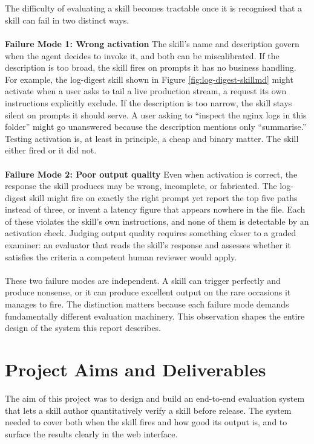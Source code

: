 \\\\
The difficulty of evaluating a skill becomes tractable once it is recognised that a skill can fail in two distinct ways.
\\\\
\textbf{Failure Mode 1: Wrong activation} The skill's name and description govern when the agent decides to invoke it, and both can be miscalibrated. If the description is too broad, the skill fires on prompts it has no business handling. For example, the log-digest skill shown in Figure \ref{fig:log-digest-skillmd} might activate when a user asks to tail a live production stream, a request its own instructions explicitly exclude. If the description is too narrow, the skill stays silent on prompts it should serve. A user asking to ``inspect the nginx logs in this folder'' might go unanswered because the description mentions only ``summarise.'' Testing activation is, at least in principle, a cheap and binary matter. The skill either fired or it did not.
\\\\
\textbf{Failure Mode 2: Poor output quality} Even when activation is correct, the response the skill produces may be wrong, incomplete, or fabricated. The log-digest skill might fire on exactly the right prompt yet report the top five paths instead of three, or invent a latency figure that appears nowhere in the file. Each of these violates the skill's own instructions, and none of them is detectable by an activation check. Judging output quality requires something closer to a graded examiner: an evaluator that reads the skill's response and assesses whether it satisfies the criteria a competent human reviewer would apply.
\\\\
These two failure modes are independent. A skill can trigger perfectly and produce nonsense, or it can produce excellent output on the rare occasions it manages to fire. The distinction matters because each failure mode demands fundamentally different evaluation machinery. This observation shapes the entire design of the system this report describes.

\section{Project Aims and Deliverables}
The aim of this project was to design and build an end-to-end evaluation system that lets a skill author quantitatively verify a skill before release. The system needed to cover both when the skill fires and how good its output is, and to surface the results clearly in the web interface.

